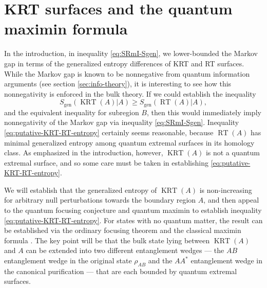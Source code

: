\documentclass[a4paper,11pt]{article}
\newcommand{\RT}{\operatorname{RT}}
\newcommand{\KRT}{\operatorname{KRT}}
\begin{document}

\appendix

\section{KRT surfaces and the quantum maximin formula}
\label{app:KRT}

In the introduction, in inequality \eqref{eq:SRmI-Sgen}, we lower-bounded the Markov gap in terms of the generalized entropy differences of KRT and RT surfaces. While the Markov gap is known to be nonnegative from quantum information arguments (see section \ref{sec:info-theory}), it is interesting to see how this nonnegativity is enforced in the bulk theory. If we could establish the inequality
\begin{equation} \label{eq:putative-KRT-RT-entropy}
	S_{\text{gen}}(\KRT(A)|A) \geq S_{\text{gen}}(\RT(A)|A),
\end{equation}
and the equivalent inequality for subregion $B$, then this would immediately imply nonnegativity of the Markov gap via inequality \eqref{eq:SRmI-Sgen}. Inequality \eqref{eq:putative-KRT-RT-entropy} certainly seems reasonable, because $\RT(A)$ has minimal generalized entropy among quantum extremal surfaces in its homology class. As emphasized in the introduction, however, $\KRT(A)$ is not a quantum extremal surface, and so some care must be taken in establishing \eqref{eq:putative-KRT-RT-entropy}.

We will establish that the generalized entropy of $\KRT(A)$ is non-increasing for arbitrary null perturbations towards the boundary region $A$, and then appeal to the quantum focusing conjecture \cite{bousso2016quantum} and quantum maximin \cite{quantum-maximin} to establish inequality \eqref{eq:putative-KRT-RT-entropy}. For states with no quantum matter, the result can be established via the ordinary focusing theorem and the classical maximin formula \cite{maximin}. The key point will be that the bulk state lying between $\KRT(A)$ and $A$ can be extended into two different entanglement wedges --- the $AB$ entanglement wedge in the original state $\rho_{AB}$ and the $AA^*$ entanglement wedge in the canonical purification --- that are each bounded by quantum extremal surfaces.
\end{document}
